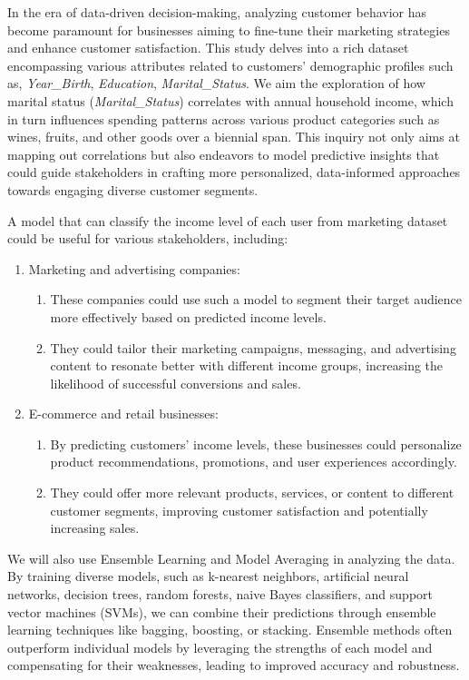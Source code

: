 
In the era of data-driven decision-making, analyzing customer behavior has become paramount for businesses aiming to fine-tune their marketing strategies and enhance customer satisfaction. This study delves into a rich dataset encompassing various attributes related to customers' demographic profiles such as, \textit{Year\_Birth}, \textit{Education}, \textit{Marital\_Status}. We aim the exploration of how marital status (\textit{Marital\_Status}) correlates with annual household income, which in turn influences spending patterns across various product categories such as wines, fruits, and other goods over a biennial span. This inquiry not only aims at mapping out correlations but also endeavors to model predictive insights that could guide stakeholders in crafting more personalized, data-informed approaches towards engaging diverse customer segments. 

A model that can classify the income level of each user from marketing dataset could be useful for various stakeholders, including:
\begin{enumerate}
    \item Marketing and advertising companies:
    \begin{enumerate}
        \item These companies could use such a model to segment their target audience more effectively based on predicted income levels.
        \item They could tailor their marketing campaigns, messaging, and advertising content to resonate better with different income groups, increasing the likelihood of successful conversions and sales.
    \end{enumerate}
    
  
    \item E-commerce and retail businesses:
    \begin{enumerate}
        
    \item By predicting customers' income levels, these businesses could personalize product recommendations, promotions, and user experiences accordingly.
    \item They could offer more relevant products, services, or content to different customer segments, improving customer satisfaction and potentially increasing sales.
    \end{enumerate}
    
\end{enumerate}

We will also use Ensemble Learning and Model Averaging in analyzing the data. By training diverse models, such as k-nearest neighbors, artificial neural networks, decision trees, random forests, naive Bayes classifiers, and support vector machines (SVMs), we can combine their predictions through ensemble learning techniques like bagging, boosting, or stacking. Ensemble methods often outperform individual models by leveraging the strengths of each model and compensating for their weaknesses, leading to improved accuracy and robustness.
